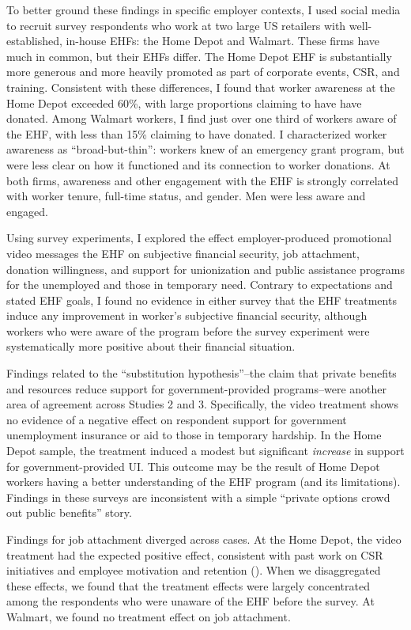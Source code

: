 \documentclass[
  11pt,
  oneside]{article}
\begin{document}
To better ground these findings in specific employer contexts, I used social media to recruit survey respondents who work at two large US retailers with well-established, in-house EHFs: the Home Depot and Walmart. These firms have much in common, but their EHFs differ. The Home Depot EHF is substantially more generous and more heavily promoted as part of corporate events, CSR, and training. Consistent with these differences, I found that worker awareness at the Home Depot exceeded 60\%, with large proportions claiming to have have donated. Among Walmart workers, I find just over one third of workers aware of the EHF, with less than 15\% claiming to have donated. I characterized worker awareness as ``broad-but-thin'': workers knew of an emergency grant program, but were less clear on how it functioned and its connection to worker donations. At both firms, awareness and other engagement with the EHF is strongly correlated with worker tenure, full-time status, and gender. Men were less aware and engaged.

Using survey experiments, I explored the effect employer-produced promotional video messages the EHF on subjective financial security, job attachment, donation willingness, and support for unionization and public assistance programs for the unemployed and those in temporary need. Contrary to expectations and stated EHF goals, I found no evidence in either survey that the EHF treatments induce any improvement in worker's subjective financial security, although workers who were aware of the program before the survey experiment were systematically more positive about their financial situation.

Findings related to the ``substitution hypothesis''--the claim that private benefits and resources reduce support for government-provided programs--were another area of agreement across Studies 2 and 3. Specifically, the video treatment shows no evidence of a negative effect on respondent support for government unemployment insurance or aid to those in temporary hardship. In the Home Depot sample, the treatment induced a modest but significant \emph{increase} in support for government-provided UI. This outcome may be the result of Home Depot workers having a better understanding of the EHF program (and its limitations). Findings in these surveys are inconsistent with a simple ``private options crowd out public benefits'' story.

Findings for job attachment diverged across cases. At the Home Depot, the video treatment had the expected positive effect, consistent with past work on CSR initiatives and employee motivation and retention (). When we disaggregated these effects, we found that the treatment effects were largely concentrated among the respondents who were unaware of the EHF before the survey. At Walmart, we found no treatment effect on job attachment.
\end{document}
